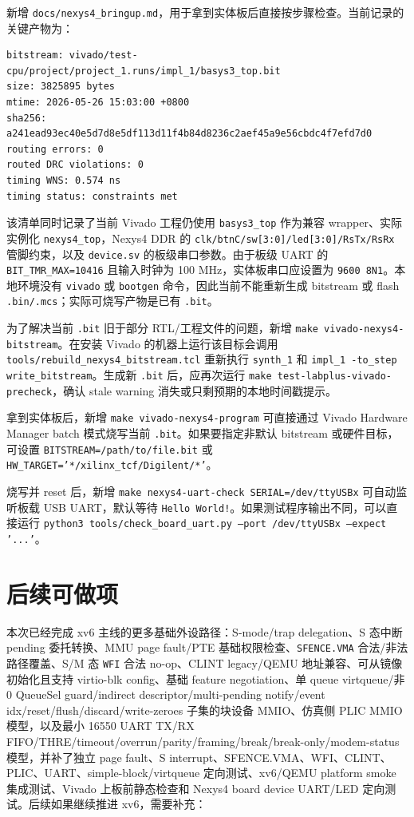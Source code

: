 \documentclass[UTF8,a4paper,11pt]{ctexart}
\begin{document}
新增 \texttt{docs/nexys4\_bringup.md}，用于拿到实体板后直接按步骤检查。当前记录的关键产物为：

\begin{Verbatim}[fontsize=\small]
bitstream: vivado/test-cpu/project/project_1.runs/impl_1/basys3_top.bit
size: 3825895 bytes
mtime: 2026-05-26 15:03:00 +0800
sha256: a241ead93ec40e5d7d8e5df113d11f4b84d8236c2aef45a9e56cbdc4f7efd7d0
routing errors: 0
routed DRC violations: 0
timing WNS: 0.574 ns
timing status: constraints met
\end{Verbatim}

该清单同时记录了当前 Vivado 工程仍使用 \texttt{basys3\_top} 作为兼容 wrapper、实际实例化 \texttt{nexys4\_top}，Nexys4 DDR 的 \texttt{clk/btnC/sw[3:0]/led[3:0]/RsTx/RsRx} 管脚约束，以及 \texttt{device.sv} 的板级串口参数。由于板级 UART 的 \texttt{BIT\_TMR\_MAX=10416} 且输入时钟为 100 MHz，实体板串口应设置为 \texttt{9600 8N1}。本地环境没有 \texttt{vivado} 或 \texttt{bootgen} 命令，因此当前不能重新生成 bitstream 或 flash \texttt{.bin/.mcs}；实际可烧写产物是已有 \texttt{.bit}。

为了解决当前 \texttt{.bit} 旧于部分 RTL/工程文件的问题，新增 \texttt{make vivado-nexys4-bitstream}。在安装 Vivado 的机器上运行该目标会调用 \texttt{tools/rebuild\_nexys4\_bitstream.tcl} 重新执行 \texttt{synth\_1} 和 \texttt{impl\_1 -to\_step write\_bitstream}。生成新 \texttt{.bit} 后，应再次运行 \texttt{make test-labplus-vivado-precheck}，确认 stale warning 消失或只剩预期的本地时间戳提示。

拿到实体板后，新增 \texttt{make vivado-nexys4-program} 可直接通过 Vivado Hardware Manager batch 模式烧写当前 \texttt{.bit}。如果要指定非默认 bitstream 或硬件目标，可设置 \texttt{BITSTREAM=/path/to/file.bit} 或 \texttt{HW\_TARGET='*/xilinx\_tcf/Digilent/*'}。

烧写并 reset 后，新增 \texttt{make nexys4-uart-check SERIAL=/dev/ttyUSBx} 可自动监听板载 USB UART，默认等待 \texttt{Hello World!}。如果测试程序输出不同，可以直接运行 \texttt{python3 tools/check\_board\_uart.py --port /dev/ttyUSBx --expect '...'}。

\section{后续可做项}

本次已经完成 xv6 主线的更多基础外设路径：S-mode/trap delegation、S 态中断 pending 委托转换、MMU page fault/PTE 基础权限检查、\texttt{SFENCE.VMA} 合法/非法路径覆盖、S/M 态 \texttt{WFI} 合法 no-op、CLINT legacy/QEMU 地址兼容、可从镜像初始化且支持 virtio-blk config、基础 feature negotiation、单 queue virtqueue/非 0 QueueSel guard/indirect descriptor/multi-pending notify/event idx/reset/flush/discard/write-zeroes 子集的块设备 MMIO、仿真侧 PLIC MMIO 模型，以及最小 16550 UART TX/RX FIFO/THRE/timeout/overrun/parity/framing/break/break-only/modem-status 模型，并补了独立 page fault、S interrupt、SFENCE.VMA、WFI、CLINT、PLIC、UART、simple-block/virtqueue 定向测试、xv6/QEMU platform smoke 集成测试、Vivado 上板前静态检查和 Nexys4 board device UART/LED 定向测试。后续如果继续推进 xv6，需要补充：
\end{document}
